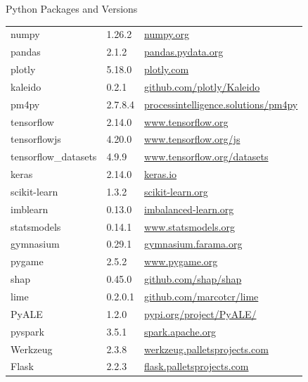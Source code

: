 \documentclass[ignorenonframetext,xcolor=dvipsnames]{beamer}
\begin{document}
\begin{frame}[label=withcode]{Python Packages and Versions}

\small
\centering

\begin{tabular}{l|l|l} \hline
numpy & 1.26.2 & \url{numpy.org} \\
pandas & 2.1.2 & \url{pandas.pydata.org} \\
plotly & 5.18.0 & \url{plotly.com} \\ 
kaleido & 0.2.1 & \url{github.com/plotly/Kaleido} \\
pm4py & 2.7.8.4 & \url{processintelligence.solutions/pm4py} \\
tensorflow & 2.14.0 & \url{www.tensorflow.org} \\
tensorflowjs & 4.20.0 & \url{www.tensorflow.org/js} \\
tensorflow\_datasets & 4.9.9 & \url{www.tensorflow.org/datasets} \\
keras & 2.14.0 & \url{keras.io} \\
scikit-learn & 1.3.2 & \url{scikit-learn.org} \\
imblearn & 0.13.0 & \url{imbalanced-learn.org} \\
statsmodels & 0.14.1 & \url{www.statsmodels.org} \\
gymnasium & 0.29.1 & \url{gymnasium.farama.org} \\
pygame & 2.5.2 & \url{www.pygame.org} \\
shap & 0.45.0 & \url{github.com/shap/shap} \\
lime & 0.2.0.1 & \url{github.com/marcotcr/lime} \\
PyALE & 1.2.0 & \url{pypi.org/project/PyALE/} \\
pyspark & 3.5.1 & \url{spark.apache.org} \\
Werkzeug & 2.3.8 & \url{werkzeug.palletsprojects.com} \\
Flask & 2.2.3 & \url{flask.palletsprojects.com} \\ \hline
\end{tabular}
\end{frame}
\end{document}
